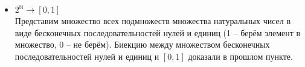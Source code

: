 \documentclass{article}
\begin{document}
\begin{itemize}
\item $2^\mathbb{N} \rightarrow [0, 1]$\\

Представим множество всех подмножеств множества натуральных чисел в виде бесконечных последовательностей нулей и единиц (1 -- берём элемент в множество, 0 -- не берём). Биекцию между множеством бесконечных последовательностей нулей и единиц и $[0, 1]$ доказали в прошлом пункте.
\end{itemize}
\end{document}
